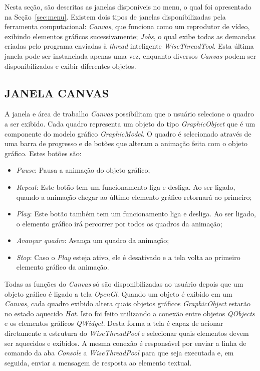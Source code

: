 Nesta seção, são descritas as janelas disponíveis no menu, o qual foi apresentado na Seção~\ref{sec:menu}. Existem dois tipos de janelas disponibilizadas pela ferramenta computacional: \textit{Canvas}, que funciona como um reprodutor de vídeo, exibindo elementos gráficos sucessivamente; \textit{Jobs}, o qual exibe todas as demandas criadas pelo programa enviadas à \textit{thread} inteligente \textit{WiseThreadTool}. Esta última janela pode ser instanciada apenas uma vez, enquanto diversos \textit{Canvas} podem ser disponibilizados e exibir diferentes objetos.

\subsection{JANELA CANVAS}\label{sec:janela_canvas}

A janela e área de trabalho \textit{Canvas} possibilitam que o usuário selecione o quadro a ser exibido. Cada quadro representa um objeto do tipo \textit{GraphicObject} que é um componente do modelo gráfico \textit{GraphicModel}. O quadro é selecionado através de uma barra de progresso e de botões que alteram a animação feita com o objeto gráfico. Estes botões são:

\begin{itemize}
	\item \textit{Pause}: Pausa a animação do objeto gráfico;
	\item \textit{Repeat}: Este botão tem um funcionamento liga e desliga. Ao ser ligado, quando a animação chegar ao último elemento gráfico retornará ao primeiro;
	\item \textit{Play}: Este botão também tem um funcionamento liga e desliga. Ao ser ligado, o elemento gráfico irá percorrer por todos os quadros da animação;
	\item \textit{Avançar quadro}: Avança um quadro da animação;
	\item \textit{Stop}: Caso o \textit{Play} esteja ativo, ele é desativado e a tela volta ao primeiro elemento gráfico da animação.
\end{itemize}

Todas as funções do \textit{Canvas} só são disponibilizadas ao usuário depois que um objeto gráfico é ligado a tela \textit{OpenGl}. Quando um objeto é exibido em um \textit{Canvas}, cada quadro exibido altera quais objetos gráficos \textit{GraphicObject} estarão no estado aquecido \textit{Hot}. Isto foi feito utilizando a conexão entre objetos \textit{QObjects} e os elementos gráficos \textit{QWidget}. Desta forma a tela é capaz de acionar diretamente a estrutura do \textit{WiseThreadPool} e selecionar quais elementos devem ser aquecidos e exibidos. A mesma conexão é responsável por enviar a linha de comando da aba \textit{Console} a \textit{WiseThreadPool} para que seja executada e, em seguida, enviar a mensagem de resposta ao elemento textual.

